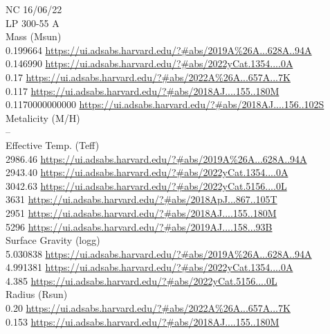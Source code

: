 NC 16/06/22\\
LP 300-55 A\\
Mass (Msun)\\
0.199664 \url{https://ui.adsabs.harvard.edu/?#abs/2019A%26A...628A..94A}\\
0.146990 \url{https://ui.adsabs.harvard.edu/?#abs/2022yCat.1354....0A}\\
0.17 \url{https://ui.adsabs.harvard.edu/?#abs/2022A%26A...657A...7K}\\
0.117 \url{https://ui.adsabs.harvard.edu/?#abs/2018AJ....155..180M}\\
0.1170000000000 \url{https://ui.adsabs.harvard.edu/?#abs/2018AJ....156..102S}\\
Metalicity (M/H)\\
--\\
Effective Temp. (Teff)\\
2986.46 \url{https://ui.adsabs.harvard.edu/?#abs/2019A%26A...628A..94A}\\
2943.40 \url{https://ui.adsabs.harvard.edu/?#abs/2022yCat.1354....0A}\\
3042.63 \url{https://ui.adsabs.harvard.edu/?#abs/2022yCat.5156....0L}\\
3631 \url{https://ui.adsabs.harvard.edu/?#abs/2018ApJ...867..105T}\\
2951 \url{https://ui.adsabs.harvard.edu/?#abs/2018AJ....155..180M}\\
5296 \url{https://ui.adsabs.harvard.edu/?#abs/2019AJ....158...93B}\\
Surface Gravity (logg)\\
5.030838 \url{https://ui.adsabs.harvard.edu/?#abs/2019A%26A...628A..94A}\\
4.991381 \url{https://ui.adsabs.harvard.edu/?#abs/2022yCat.1354....0A}\\
4.385 \url{https://ui.adsabs.harvard.edu/?#abs/2022yCat.5156....0L}\\
Radius (Rsun)\\
0.20 \url{https://ui.adsabs.harvard.edu/?#abs/2022A%26A...657A...7K}\\
0.153 \url{https://ui.adsabs.harvard.edu/?#abs/2018AJ....155..180M}\\

